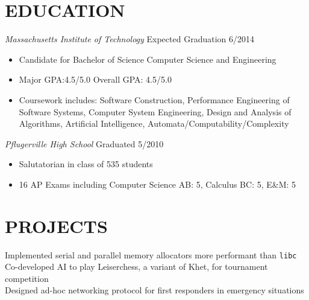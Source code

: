 \documentclass[margin]{res}
\begin{document}
\begin{resume}
\section{EDUCATION} {\sl Massachusetts Institute of Technology} 
                    \hfill Expected Graduation 6/2014
                    \begin{itemize} \itemsep -2pt %
                        \item Candidate for Bachelor of Science Computer Science
                        and Engineering
                        \item Major GPA:4.5/5.0 Overall GPA: 4.5/5.0 
                        \item Coursework includes:
                          Software Construction,
                          Performance Engineering of Software Systems, 
                          Computer System Engineering, 
                          Design and Analysis of Algorithms, 
                          Artificial Intelligence, 
                          Automata/Computability/Complexity
                    \end{itemize}

                    {\sl Pflugerville High School} \hfill Graduated 5/2010
                    \begin{itemize} \itemsep -2pt %
                         \item Salutatorian in class of 535 students
                         \item 16 AP Exams including Computer Science AB: 5, 
                               Calculus BC: 5, E\&M: 5
                    \end{itemize}

\section{PROJECTS}  Implemented serial and parallel memory allocators more
                      performant than \texttt{libc} \\
                    Co-developed AI to play Leiserchess, a variant of Khet, for 
                      tournament competition \\
                    Designed ad-hoc networking protocol for first responders in
                      emergency situations
 

\end{resume}
\end{document}
